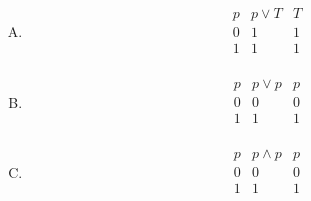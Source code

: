 {{\begin{practices}
\begin{enumerate}[A.]
                {
                    \begin{table}[H]
                        \[
                            \begin{array}{c|c|c}
                                \hline
                                p & p \wedge F & F \\
                                \hline
                                0 & 0 & 0 \\
                                1 & 0 & 0 \\
                            \end{array}
                        \]
                    \end{table}
                }
                \item
                {
                    \begin{table}[H]
                        \[
                            \begin{array}{c|c|c}
                                \hline
                                p & p \vee T & T \\
                                \hline
                                0 & 1 & 1 \\
                                1 & 1 & 1 \\
                            \end{array}
                        \]
                    \end{table}
                }
                \item
                {
                    \begin{table}[H]
                        \[
                            \begin{array}{c|c|c}
                                \hline
                                p & p \vee p & p \\
                                \hline
                                0 & 0 & 0 \\
                                1 & 1 & 1 \\
                            \end{array}
                        \]
                    \end{table}
                }
                \item
                {
                    \begin{table}[H]
                        \[
                            \begin{array}{c|c|c}
                                \hline
                                p & p \wedge p & p \\
                                \hline
                                0 & 0 & 0 \\
                                1 & 1 & 1 \\
                            \end{array}
                        \]
                    \end{table}
                }
            \end{enumerate}
        \end{practices}

}}
